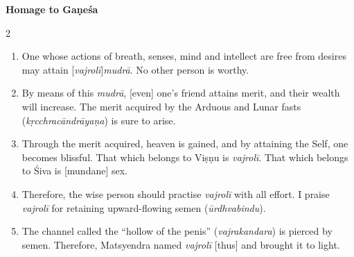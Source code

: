 \begin{nohyp}
\begin{eng}
\centerline{}
\vskip 7pt

\centerline{{\large\bfseries Homage to Gaṇeśa}}
\end{eng}
\vskip 7pt

\begin{multicols}{2}
\begin{eng}
\Section*[Introduction]{[Introduction]}
\begin{enumerate}[nosep]
\itemsep=0pt
\item[1.] One whose actions of breath, senses, mind and intellect are free from desires may attain [\textit{vajrolī}]\textit{mudrā}. No other person is worthy.
\item[2.] By means of this \textit{mudrā}, [even] one’s friend attains merit, and their wealth will increase. The merit acquired by the Arduous and Lunar fasts (\textit{kṛcchracāndrāyaṇa}) is sure to arise.
\item[3.] Through the merit acquired, heaven is gained, and by attaining the Self, one becomes blissful. That which belongs to Viṣṇu is \textit{vajrolī}. That which belongs to Śiva is [mundane] sex.
\item[4.] Therefore, the wise person should practise \textit{vajrolī} with all effort. I praise \textit{vajrolī} for retaining upward-flowing semen (\textit{ūrdhvabindu}).
\item[5.] The channel called the ``hollow of the penis'' (\textit{vajrakandara}) is pierced by semen. Therefore, Matsyendra named \textit{vajrolī} [thus] and brought it to light.
\end{enumerate}
\vskip 7pt

\vskip 7pt


\end{eng}
\end{multicols}
\end{nohyp}
